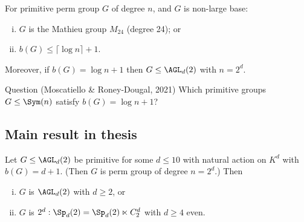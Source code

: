 \begin{slide}
    \begin{theorem}
        \vspace{0pt}
        For primitive perm group $G$ of degree $n$, and $G$ is non-large base:
        \begin{enumerate}[(i)]
            \item $G$ is the Mathieu group $M_{24}$ (degree 24); or
            \item $b(G) \leq \lceil\log n\rceil + 1$.
        \end{enumerate} \pause

        Moreover, if $b(G) = \log n + 1$ then $G \leq \AGL_d(2)$ with $n = 2^d$.
    \end{theorem} \pause

    \begin{alertblock}{Question (Moscatiello \& Roney-Dougal, 2021)}
        \vspace{0pt}
        Which primitive groups $G \leq \Sym(n)$ satisfy $b(G) = \log n + 1$?
    \end{alertblock}
\end{slide}

\subsection{Main result in thesis}

\begin{slide}
    \begin{theorem}
        \vspace{0pt}
        Let $G \leq \AGL_d(2)$ be primitive for some $d \leq 10$ with natural action on $K^d$ with $b(G) = d + 1$. (Then $G$ is perm group of degree $n = 2^d$.) Then

        \begin{enumerate}[(i)]
            \item $G$ is $\AGL_d(2)$ with $d \geq 2$, or \pause
            \item $G$ is $2^d : \Sp_d(2) = \Sp_d(2) \ltimes C_2^d$ with $d \geq 4$ even.
        \end{enumerate}
    \end{theorem}
\end{slide}

